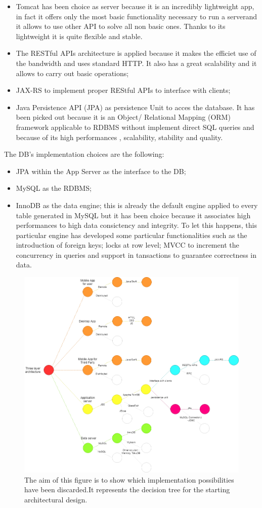 \begin{itemize}
	\item Tomcat has been choice as server because it is an incredibly lightweight app, in fact it offers only the most basic 				functionality necessary to run a serverand it allows to use other API to solve all non basic ones. Thanks to its lightweight it is 			quite flexible and stable.
	\item The RESTful APIs architecture is applied because it makes the efficiet use of the bandwidth and uses standard HTTP. It 			also has a great scalability and it allows to carry out basic operations;
	\item JAX-RS to implement proper REStful APIs to interface with clients;
	\item Java Persistence API (JPA) as persistence Unit to acces the database. It has been picked out because it is an Object/			Relational Mapping (ORM) framework applicable to RDBMS without implement direct SQL queries and because of its high 				performances , scalability, stability and quality.
\end{itemize}
The DB's implementation choices are the following:
\begin{itemize}
	\item JPA within the App Server as the interface to the DB;
	\item MySQL as the RDBMS;
	\item InnoDB as the data engine; this is already the default engine applied to every table generated in MySQL but it has been 			choice because it associates high performances to high data consictency and integrity. To let this happens, this particular 			engine has developed some particular functionalities such as the introduction of foreign keys; locks at row level; MVCC to 			increment the concurrency in queries and support in tansactions to guarantee correctness in data.
\end{itemize}

\begin{figure}[h!]
	\includegraphics[width=1.0\textwidth]{./pictures/choice_diagram.png}\par
	\caption{The aim of this figure is to show which implementation possibilities have been discarded.It represents the decision 			tree for the starting architectural design. }
\end{figure}
\FloatBarrier
